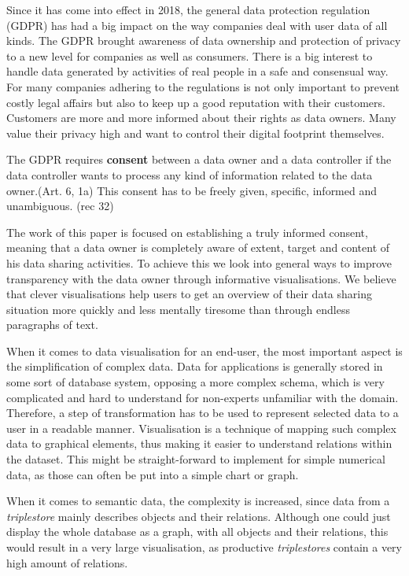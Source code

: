 
  Since it has come into effect in 2018, the general data protection regulation (GDPR) has had a big impact on the way companies deal with user data of all kinds.
  The GDPR brought awareness of data ownership and protection of privacy to a new level for companies as well as consumers.
  There is a big interest to handle data generated by activities of real people in a safe and consensual way. For many companies adhering to the regulations is not only important to prevent costly legal affairs but also to keep up a good reputation with their customers.
  Customers are more and more informed about their rights as data owners. Many value their privacy high and want to control their digital footprint themselves.
  
  The GDPR requires \textbf{consent} between a data owner and a data controller if the data controller wants to process any kind of information related to the data owner.(Art. 6, 1a) This consent has to be freely given, specific, informed and unambiguous. (rec 32)
  
  The work of this paper is focused on establishing a truly informed consent, meaning that a data owner is completely aware of extent, target and content of his data sharing activities. 
  To achieve this we look into general ways to improve transparency with the data owner through informative visualisations. We believe that clever visualisations help users to get an overview of their data sharing situation more quickly and less mentally tiresome than through endless paragraphs of text.
  
  When it comes to data visualisation for an end-user, the most important aspect is the simplification of complex data. Data for applications is generally stored in some sort of database system, opposing a more complex schema, which is very complicated and hard to understand for non-experts unfamiliar with the domain. Therefore, a step of transformation has to be used to represent selected data to a user in a readable manner. Visualisation is a technique of mapping such complex data to graphical elements, thus making it easier to understand relations within the dataset. This might be straight-forward to implement for simple numerical data, as those can often be put into a simple chart or graph.

  When it comes to semantic data, the complexity is increased, since data from a \textit{triplestore} mainly describes objects and their relations. Although one could just display the whole database as a graph, with all objects and their relations, this would result in a very large visualisation, as productive \textit{triplestores} contain a very high amount of relations.


